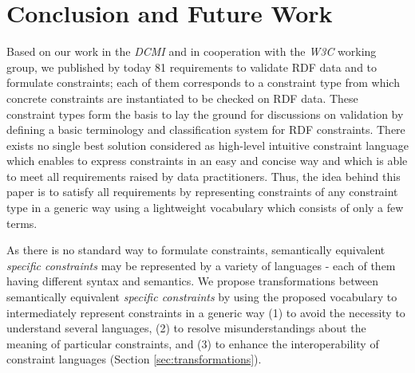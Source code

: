\documentclass[a4paper,fontsize=11pt]{scrartcl}
\begin{document}
\section{Conclusion and Future Work}


Based on our work in the \emph{DCMI} and in cooperation with the \emph{W3C} working group,
we published by today 81 requirements to validate RDF data and to formulate constraints; 
each of them corresponds to a constraint type from which concrete constraints are instantiated to be checked on RDF data.
These constraint types form the basis to
lay the ground for discussions on validation
by defining a basic terminology and classification system for RDF constraints.
%
There exists no single best solution considered as high-level intuitive constraint language which enables to express constraints in an easy and concise way and which is able to meet all requirements raised by data practitioners.
Thus, the idea behind this paper is to satisfy all requirements
by representing constraints of any constraint type in a generic way using a lightweight vocabulary which consists of only a few terms.

As there is no standard way to formulate constraints, 
semantically equivalent \emph{specific constraints} may be represented by a variety of languages - each of them having different syntax and semantics.
We propose transformations between semantically equivalent \emph{specific constraints}
by using the proposed vocabulary to intermediately represent constraints in a generic way
(1) to avoid the necessity to understand several languages,
(2) to resolve misunderstandings about the meaning of particular constraints, and
(3) to enhance the interoperability of constraint languages (Section \ref{sec:transformations}).
\end{document}
